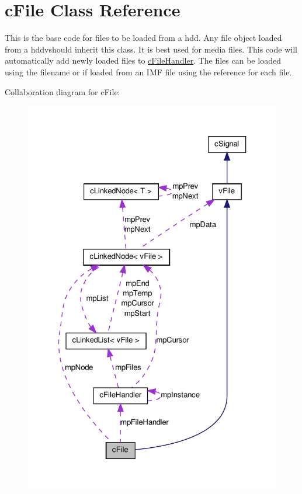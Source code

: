 \hypertarget{classc_file}{
\section{cFile Class Reference}
\label{classc_file}
}


This is the base code for files to be loaded from a hdd. Any file object loaded from a hddvshould inherit this class. It is best used for media files. This code will automatically add newly loaded files to \hyperlink{classc_file_handler}{cFileHandler}. The files can be loaded using the filename or if loaded from an IMF file using the reference for each file.  




Collaboration diagram for cFile:\nopagebreak
\begin{figure}[H]
\begin{center}
\leavevmode
\includegraphics[width=325pt]{classc_file__coll__graph}
\end{center}
\end{figure}
